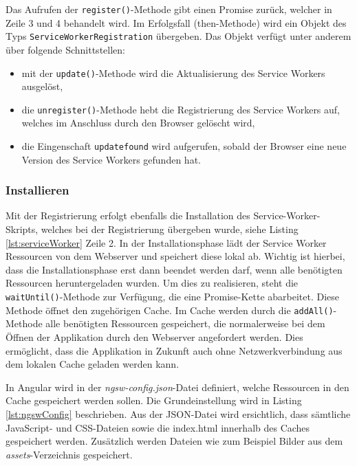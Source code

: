Das Aufrufen der \texttt{register()}-Methode gibt einen Promise zurück, welcher in Zeile 3 und 4 behandelt wird. 
Im Erfolgsfall (then-Methode) wird ein Objekt des Typs \texttt{ServiceWorkerRegistration} übergeben. Das Objekt verfügt unter anderem über folgende Schnittstellen: 
\begin{itemize}
    \item mit der \texttt{update()}-Methode wird die Aktualisierung des Service Workers ausgelöst,
    \item die \texttt{unregister()}-Methode hebt die Registrierung des Service Workers auf, welches im Anschluss durch den Browser gelöscht wird,
    \item die Eingenschaft \texttt{updatefound} wird aufgerufen, sobald der Browser eine neue Version des Service Workers gefunden hat. 
\end{itemize}

\subsubsection{Installieren}

Mit der Registrierung erfolgt ebenfalls die Installation des Service-Worker-Skripts, welches bei der Registrierung übergeben wurde, siehe Listing \ref{lst:serviceWorker} Zeile 2.
In der Installationsphase lädt der Service Worker Ressourcen von dem Webserver und speichert diese lokal ab. Wichtig ist hierbei, dass die Installationsphase erst dann beendet werden darf, wenn alle benötigten Ressourcen heruntergeladen wurden. Um dies zu realisieren, steht die \texttt{waitUntil()}-Methode zur Verfügung, die eine Promise-Kette abarbeitet. Diese Methode öffnet den zugehörigen Cache. Im Cache werden durch die \texttt{addAll()}-Methode alle benötigten Ressourcen gespeichert, die normalerweise bei dem Öffnen der Applikation durch den Webserver angefordert werden. Dies ermöglicht, dass die Applikation in Zukunft auch ohne Netzwerkverbindung aus dem lokalen Cache geladen werden kann. 

In Angular wird in der \textit{ngsw-config.json}-Datei definiert, welche Ressourcen in den Cache gespeichert werden sollen. Die Grundeinstellung wird in Listing \ref{lst:ngswConfig} beschrieben. Aus der JSON-Datei wird ersichtlich, dass sämtliche JavaScript- und CSS-Dateien sowie die index.html innerhalb des Caches gespeichert werden. Zusätzlich werden Dateien wie zum Beispiel Bilder aus dem \textit{assets}-Verzeichnis gespeichert. 



